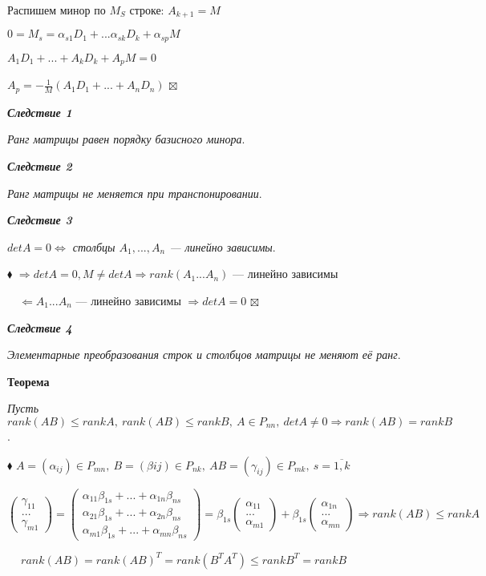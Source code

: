 \documentclass[a4paper, 12pt]{report}
\begin{document}
	\quad Распишем минор по $M_{S}$ строке: $A_{k+1} = M$
	
	\quad $0 = M_{s} = \alpha_{s1}D_{1} + ... \alpha_{sk}D_{k} + \alpha_{sp}M$
	
	\quad $A_{1}D_{1} + ... + A_{k}D_{k} + A_{p}M = 0$
	
	\quad $A_{p} = -\frac{1}{M}(A_{1}D_{1} + ... + A_{n}D_{n})$ $\boxtimes$
	\par\bigskip
	\textit{\textbf{Следствие 1}}
	
	\textit{Ранг матрицы равен порядку базисного минора}.
	\par\bigskip
	\textit{\textbf{Следствие 2}}
	
	\textit{Ранг матрицы не меняется при транспонировании}.
	\par\bigskip
	\textit{\textbf{Следствие 3}}
	
	\textit{$detA = 0 \Longleftrightarrow$ столбцы $A_{1}, ..., A_{n}$ --- линейно зависимы}.
	\par\bigskip
	$\blacklozenge$ $\Rightarrow detA = 0, M \ne detA \Rightarrow rank(A_{1} ... A_{n})$ --- линейно зависимы
	
	$\quad\Leftarrow A_{1} ... A_{n}$ --- линейно зависимы $\Rightarrow detA = 0$ $\boxtimes$
	\par\bigskip
	\textit{\textbf{Следствие 4}}
	
	\textit{Элементарные преобразования строк и столбцов матрицы не меняют её ранг}.
	\par\bigskip
	\textbf{Теорема}
	
	\textit{Пусть $rank(AB) \leqslant rankA,\ rank(AB) \leqslant rankB,\ A \in P_{nn},\ detA \ne 0 \Rightarrow rank(AB) = rankB$}.
	
	$\blacklozenge$ $A = (\alpha_{ij}) \in P_{mn},\ B = (\beta{ij}) \in P_{nk},\ AB = (\gamma_{ij}) \in P_{mk},\ s = \overline{1, k}$
	\par\bigskip
	$\quad$ $\begin{pmatrix} \gamma_{11}
		\\ ...
		\\ \gamma_{m1}
	\end{pmatrix} = \begin{pmatrix} 
		\alpha_{11}\beta_{1s} + ... + \alpha_{1n}\beta_{ns}
		\\ \alpha_{21}\beta_{1s} + ... + \alpha_{2n}\beta_{ns}
		\\ \alpha_{m1}\beta_{1s} + ... + \alpha_{mn}\beta_{ns}
	\end{pmatrix} = \beta_{1s}\begin{pmatrix} \alpha_{11}
		\\ ...
		\\ \alpha_{m1}
	\end{pmatrix} + \beta_{1s}\begin{pmatrix} \alpha_{1n}
		\\ ...
		\\ \alpha_{mn}
	\end{pmatrix} \Rightarrow rank(AB) \leqslant rankA$
	\par\bigskip
	$\quad \ rank(AB) = rank(AB)^{T} = rank(B^{T}A^{T}) \leqslant rankB^{T} = rankB$
	
\end{document}
